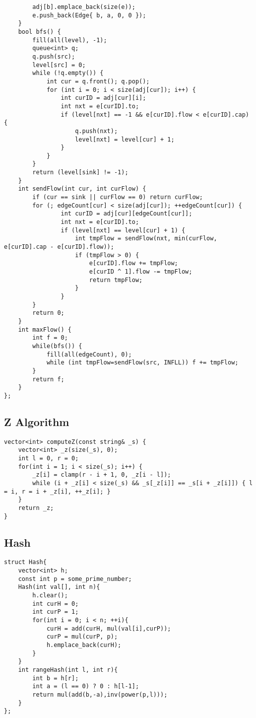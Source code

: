 \documentclass[12pt,a4paper,onesided]{article}
\begin{document}
\begin{multicols}{3}
\begin{lstlisting}
		adj[b].emplace_back(size(e));
		e.push_back(Edge{ b, a, 0, 0 });
	}
	bool bfs() {
		fill(all(level), -1);
		queue<int> q;
		q.push(src);
		level[src] = 0;
		while (!q.empty()) {
			int cur = q.front(); q.pop();
			for (int i = 0; i < size(adj[cur]); i++) {
				int curID = adj[cur][i];
				int nxt = e[curID].to;
				if (level[nxt] == -1 && e[curID].flow < e[curID].cap) {
					q.push(nxt);
					level[nxt] = level[cur] + 1;
				}
			}
		}
		return (level[sink] != -1);
	}
	int sendFlow(int cur, int curFlow) {
		if (cur == sink || curFlow == 0) return curFlow;
		for (; edgeCount[cur] < size(adj[cur]); ++edgeCount[cur]) {
				int curID = adj[cur][edgeCount[cur]];
				int nxt = e[curID].to;
				if (level[nxt] == level[cur] + 1) {
					int tmpFlow = sendFlow(nxt, min(curFlow, e[curID].cap - e[curID].flow));
					if (tmpFlow > 0) {
						e[curID].flow += tmpFlow;
						e[curID ^ 1].flow -= tmpFlow;
						return tmpFlow;
					}
				}
		}
		return 0;
	}
	int maxFlow() {
		int f = 0;
		while(bfs()) {
			fill(all(edgeCount), 0);
			while (int tmpFlow=sendFlow(src, INFLL)) f += tmpFlow;
		}
		return f;
	}
};
\end{lstlisting}


\subsection{Z Algorithm}
\begin{lstlisting}
vector<int> computeZ(const string& _s) {
    vector<int> _z(size(_s), 0);
    int l = 0, r = 0;
	for(int i = 1; i < size(_s); i++) {
		_z[i] = clamp(r - i + 1, 0, _z[i - l]);
		while (i + _z[i] < size(_s) && _s[_z[i]] == _s[i + _z[i]]) { l = i, r = i + _z[i], ++_z[i]; }
	}
	return _z;
}
\end{lstlisting}


\subsection{Hash}
\begin{lstlisting}
struct Hash{
    vector<int> h;
    const int p = some_prime_number;
    Hash(int val[], int n){
        h.clear();
        int curH = 0;
        int curP = 1;
        for(int i = 0; i < n; ++i){
            curH = add(curH, mul(val[i],curP));
            curP = mul(curP, p);
            h.emplace_back(curH);
        }
    }
    int rangeHash(int l, int r){
        int b = h[r];
        int a = (l == 0) ? 0 : h[l-1];
        return mul(add(b,-a),inv(power(p,l)));
    }
};
\end{lstlisting}



\end{multicols}
\end{document}

